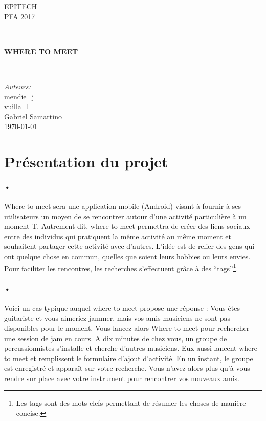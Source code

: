 \documentclass[pdftex,12pt,a4paper]{article}
\newcommand{\HRule}{\rule{\linewidth}{0.5mm}}
\begin{document}
\begin{titlepage}
\begin{center}

\textsc{\LARGE EPITECH}\\[1.5cm]
\textsc{\Large PFA 2017}\\[0.5cm]
\HRule \\[0.4cm]
{\huge \bfseries WHERE TO MEET \\[0.4cm]}
\HRule \\[1.5cm]

\emph{Auteurs:}\\
mendie\_j \\
vuilla\_l \\
Gabriel Samartino \\

\vfill
{\large \today}

\end{center}
\end{titlepage}
\section{Pr\'esentation du projet}
\paragraph{•}
Where to meet sera une application mobile (Android) visant \`a fournir \`a ses  utilisateurs un moyen de se rencontrer autour d’une activit\'e particuli\`ere à un moment T.
Autrement dit, where to meet permettra de cr\'eer des liens sociaux entre des individus qui pratiquent la m\^eme activit\'e au m\^eme moment et souhaitent partager cette activit\'e avec d’autres. L'id\'ee est de relier des gens qui ont quelque chose en commun, quelles que soient leurs hobbies ou leurs envies. 
Pour faciliter les rencontres, les recherches s'effectuent gr\^ace à des “tags”\footnote{Les tags sont des mots-clefs permettant de r\'esumer les choses de manière concise.
}.

\paragraph{•}
Voici un cas typique auquel where to meet propose une r\'eponse :
Vous \^etes guitariste et vous aimeriez jammer, mais vos amis musiciens ne sont pas disponibles pour le moment. Vous lancez alors Where to meet pour rechercher une session de jam en cours. A dix minutes de chez vous, un groupe de percussionnistes s'installe et cherche d’autres musiciens. Eux aussi lancent where to meet et remplissent le formulaire d’ajout d'activit\'e. En un instant, le groupe est enregistr\'e et appara\^it sur votre recherche. Vous n’avez alors plus qu’à vous rendre sur place avec votre instrument pour rencontrer vos nouveaux amis.
\end{document}
